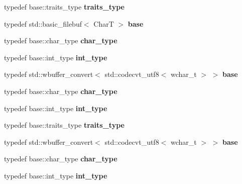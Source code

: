 \begin{DoxyCompactItemize}
typedef base\+::traits\+\_\+type {\bfseries traits\+\_\+type}
\item 
\mbox{\label{structtest__buf_a8ffc8732def58a5aea9cf554ae2cf5c1}} 
typedef std\+::basic\+\_\+filebuf$<$ CharT $>$ {\bfseries base}
\item 
\mbox{\label{structtest__buf_ad9efd221a65faf6eabbd82c50c72f7f1}} 
typedef base\+::char\+\_\+type {\bfseries char\+\_\+type}
\item 
\mbox{\label{structtest__buf_a824d143321ad5e6d087d55c59a7a9ea6}} 
typedef base\+::int\+\_\+type {\bfseries int\+\_\+type}
\item 
\mbox{\label{structtest__buf_a46442a28d5ada8ecd95002e4ef84cad4}} 
typedef std\+::wbuffer\+\_\+convert$<$ std\+::codecvt\+\_\+utf8$<$ wchar\+\_\+t $>$ $>$ {\bfseries base}
\item 
\mbox{\label{structtest__buf_ad9efd221a65faf6eabbd82c50c72f7f1}} 
typedef base\+::char\+\_\+type {\bfseries char\+\_\+type}
\item 
\mbox{\label{structtest__buf_a824d143321ad5e6d087d55c59a7a9ea6}} 
typedef base\+::int\+\_\+type {\bfseries int\+\_\+type}
\item 
\mbox{\label{structtest__buf_ad2ec103e3e5c69ece4b70dc12c83b1ce}} 
typedef base\+::traits\+\_\+type {\bfseries traits\+\_\+type}
\item 
\mbox{\label{structtest__buf_a46442a28d5ada8ecd95002e4ef84cad4}} 
typedef std\+::wbuffer\+\_\+convert$<$ std\+::codecvt\+\_\+utf8$<$ wchar\+\_\+t $>$ $>$ {\bfseries base}
\item 
\mbox{\label{structtest__buf_ad9efd221a65faf6eabbd82c50c72f7f1}} 
typedef base\+::char\+\_\+type {\bfseries char\+\_\+type}
\item 
\mbox{\label{structtest__buf_a824d143321ad5e6d087d55c59a7a9ea6}} 
typedef base\+::int\+\_\+type {\bfseries int\+\_\+type}
\item 
\mbox{\label{structtest__buf_ad2ec103e3e5c69ece4b70dc12c83b1ce}} 

\end{DoxyCompactItemize}
